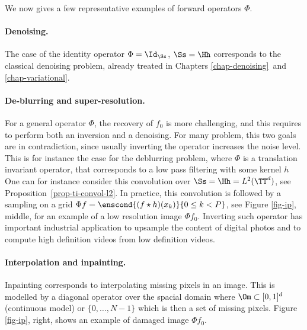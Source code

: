 We now gives a few representative examples of forward operators $\Phi$.

\paragraph{Denoising.}

The case of the identity operator $\Phi=\Id_\Ss$, $\Ss=\Hh$ corresponds to the classical denoising problem, already treated in Chapters \ref{chap-denoising} and \ref{chap-variational}. 

\paragraph{De-blurring and super-resolution.}

For a general operator $\Phi$, the recovery of $f_0$ is more challenging, and this requires to perform both an inversion and a denoising. For many problem, this two goals are in contradiction, since usually inverting the operator increases the noise level.
%
This is for instance the case for the deblurring problem, where $\Phi$ is a translation invariant operator, that corresponds to a low pass filtering with some kernel $h$
One can for instance consider this convolution over $\Ss=\Hh=L^2(\TT^d)$, see Proposition~\ref{prop-ti-convol-l2}. 
%
In practice, this convolution is followed by a sampling on a grid $\Phi f = \enscond{(f \star h)(x_k)}{0 \leq k< P}$, see Figure \ref{fig-ip}, middle, for an example of a low resolution image $\Phi f_0$.
%
Inverting such operator has important industrial application to upsample the content of digital photos and to compute high definition videos from low definition videos.


\paragraph{Interpolation and inpainting.}

Inpainting corresponds to interpolating missing pixels in an image. This is modelled by a diagonal operator over the spacial domain
where $\Om \subset [0,1]^d$ (continuous model) or $\{0,\ldots,N-1\}$ which is then a set of missing pixels.
%
Figure \ref{fig-ip}, right, shows an example of damaged image $\Phi f_0$.



